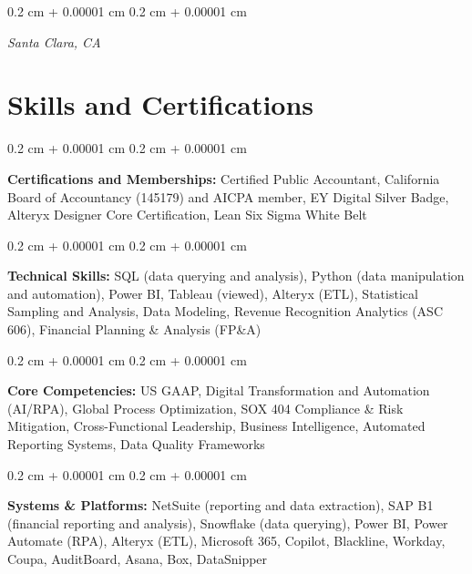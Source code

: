 \documentclass[10pt, letterpaper]{article}
\newenvironment{onecolentry}{
    \begin{adjustwidth}{
        0.2 cm + 0.00001 cm
    }{
        0.2 cm + 0.00001 cm
    }
}{
    \end{adjustwidth}
} %
\begin{document}
        \vspace{0.10 cm}
        \begin{onecolentry}
            \textit{Santa Clara, CA}
        \end{onecolentry}

    
    \section{Skills and Certifications}

        \begin{onecolentry}
            \textbf{Certifications and Memberships:} Certified Public Accountant, California Board of Accountancy (145179) and AICPA member, EY Digital Silver Badge, Alteryx Designer Core Certification, Lean Six Sigma White Belt
        \end{onecolentry}

        \vspace{0.2 cm}

        \begin{onecolentry}
            \textbf{Technical Skills:} SQL (data querying and analysis), Python (data manipulation and automation), Power BI, Tableau (viewed), Alteryx (ETL), Statistical Sampling and Analysis, Data Modeling, Revenue Recognition Analytics (ASC 606), Financial Planning \& Analysis (FP\&A)
        \end{onecolentry}

        \vspace{0.2 cm}

        \begin{onecolentry}
            \textbf{Core Competencies:} US GAAP, Digital Transformation and Automation (AI/RPA), Global Process Optimization, SOX 404 Compliance \& Risk Mitigation, Cross-Functional Leadership, Business Intelligence, Automated Reporting Systems, Data Quality Frameworks
        \end{onecolentry}

        \vspace{0.2 cm}

        \begin{onecolentry}
            \textbf{Systems \& Platforms:} NetSuite (reporting and data extraction), SAP B1 (financial reporting and analysis), Snowflake (data querying), Power BI, Power Automate (RPA), Alteryx (ETL), Microsoft 365, Copilot, Blackline, Workday, Coupa, AuditBoard, Asana, Box, DataSnipper
        \end{onecolentry}
\end{document}
